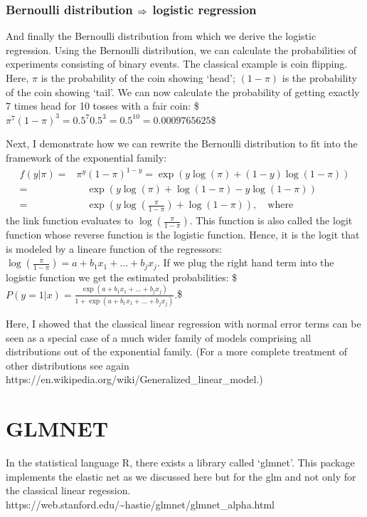 \documentclass[letterpaper,10pt,english]{jupyterBook}
\begin{document}
\subsection{Bernoulli distribution \protect\(\Rightarrow\protect\) logistic regression}
\label{\detokenize{Regression_Techniques:bernoulli-distribution-rightarrow-logistic-regression}}
\sphinxAtStartPar
And finally the Bernoulli distribution from which we derive the logistic
regression. Using the Bernoulli distribution, we can calculate the probabilities of experiments consisting of binary events. The classical example is coin flipping. Here, \(\pi\) is the probability of the coin showing ‘head’; \((1-\pi)\) is the probability of the coin showing ‘tail’. We can now calculate the probability of getting exactly 7 times head for 10 tosses with a fair coin:
\$\(\pi^7 (1-\pi)^3 = 0.5^7 0.5^3 = 0.5^{10} = 0.0009765625\)\$

\sphinxAtStartPar
Next, I demonstrate how we can rewrite the Bernoulli distribution to fit into the framework of the exponential family:
\begin{eqnarray*}
f(y |\pi) =& \pi^y (1-\pi)^{1-y} = \exp\left(y \log(\pi) + (1-y) \log(1-\pi)\right)\\
= & \quad \exp\left(y \log(\pi) + \log(1-\pi) - y\log(1-\pi)\right)\\
=&\quad \exp\left(y\log(\frac{\pi}{1-\pi}) + \log(1-\pi)\right),\quad\text{where}
\end{eqnarray*}
\sphinxAtStartPar
the link function evaluates to \(\log(\frac{\pi}{1-\pi})\). This function
is also called the logit function whose reverse function is the logistic
function. Hence, it is the logit that is modeled by a lineare function
of the regressors:
\(\log(\frac{\pi}{1-\pi}) = a + b_{1}x_1 + \ldots + b_jx_j\). If we plug
the right hand term into the logistic function we get the estimated
probabilities:
\$\(P(y=1 |x) = \frac{\exp(a + b_{1}x_1 + \ldots + b_jx_j)}{1 + \exp(a + b_{1}x_1 + \ldots + b_jx_j)}.\)\$

\sphinxAtStartPar
Here, I showed that the classical linear regression with normal
error terms can be seen as a special case of a much wider family of
models comprising all distributions out of the exponential family. (For
a more complete treatment of other distributions see again
https://en.wikipedia.org/wiki/Generalized\_linear\_model.)


\chapter{GLMNET}
\label{\detokenize{Regression_Techniques:glmnet}}
\sphinxAtStartPar
In the statistical language R, there exists a library called ‘glmnet’. This package implements the elastic net as we discussed here but for the glm and not only for the classical linear regession.
https://web.stanford.edu/\textasciitilde{}hastie/glmnet/glmnet\_alpha.html
\end{document}
